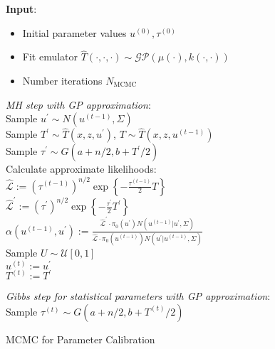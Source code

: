 \documentclass[12pt]{article}
\begin{document}
 \begin{algorithm}[H]
	\SetAlgoLined
	
	\textbf{Input}: 
	\begin{itemize}
	\item Initial parameter values $u^{(0)}, \tau^{(0)}$
	\item Fit emulator $\hat{T}(\cdot, \cdot, \cdot) \sim \mathcal{GP}(\mu(\cdot), k(\cdot, \cdot))$
	\item Number iterations $N_{\text{MCMC}}$
	\end{itemize}
		
	\bigskip
	
	 {
	\textit{MH step with GP approximation}: \\[.2cm]
	Sample $u^\prime \sim N(u^{(t - 1)}, \Sigma)$ \\
	Sample $T^\prime \sim \hat{T}(x, z, u^\prime)$, $T \sim \hat{T}(x, z, u^{(t - 1)})$ \\
	Sample $\tau^\prime \sim G(a + n/2, b + T^\prime / 2)$ \\
	Calculate approximate likelihoods: \\
	 $\hat{\mathcal{L}} := \left(\tau^{(t - 1)}\right)^{n/2} \exp\left\{-\frac{\tau^{(t - 1)}}{2} T \right\}$ \\ 
	 $\hat{\mathcal{L}}^\prime := \left(\tau^\prime \right)^{n/2} \exp\left\{-\frac{\tau^\prime}{2} T^\prime \right\}$  \\
	 $\alpha(u^{(t - 1)}, u^\prime) := \frac{\hat{\mathcal{L}}^\prime \cdot \pi_0(u^\prime) N(u^{(t - 1)}|u^\prime, \Sigma)}{\hat{\mathcal{L}} \cdot \pi_0(u^{(t - 1)}) N(u^\prime|u^{(t - 1)}, \Sigma)}$ \\
	 Sample $U \sim \mathcal{U}[0, 1]$ \\
	  {
	 	$u^{(t)} := u^\prime$ \\
		$T^{(t)} := T^\prime$ \\
	 } 
	
	\bigskip
	
	\textit{Gibbs step for statistical parameters with GP approximation}: \\[.2cm]
	Sample $\tau^{(t)} \sim G\left(a + n/2, b + T^{(t)}/2\right)$
	
	}

	
\caption{MCMC for Parameter Calibration}
\end{algorithm}
\end{document}
